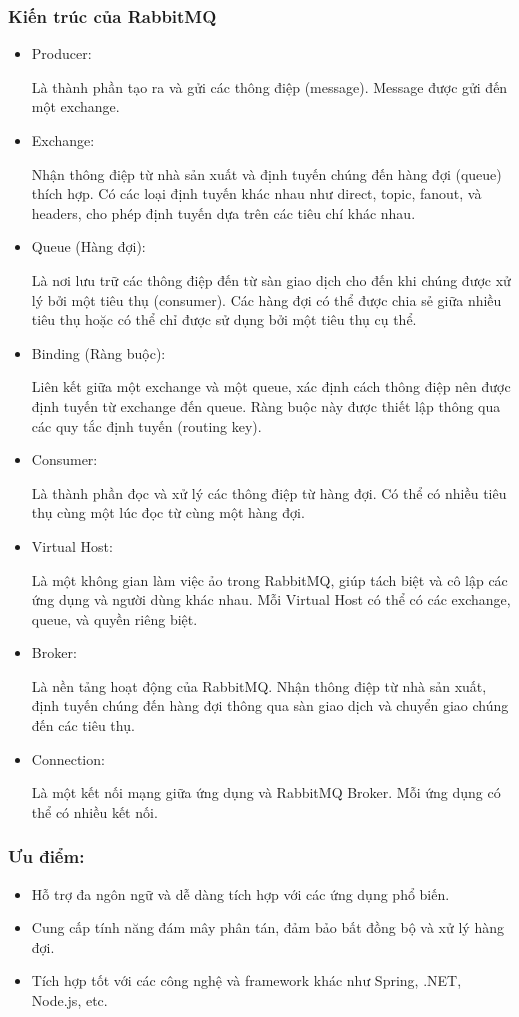 \subsubsection{Kiến trúc của RabbitMQ}
\begin{itemize}
    \item Producer:

Là thành phần tạo ra và gửi các thông điệp (message).
Message được gửi đến một exchange.
    \item Exchange:

Nhận thông điệp từ nhà sản xuất và định tuyến chúng đến hàng đợi (queue) thích hợp.
Có các loại định tuyến khác nhau như direct, topic, fanout, và headers, cho phép định tuyến dựa trên các tiêu chí khác nhau.
    \item Queue (Hàng đợi):

Là nơi lưu trữ các thông điệp đến từ sàn giao dịch cho đến khi chúng được xử lý bởi một tiêu thụ (consumer).
Các hàng đợi có thể được chia sẻ giữa nhiều tiêu thụ hoặc có thể chỉ được sử dụng bởi một tiêu thụ cụ thể.
    \item Binding (Ràng buộc):

Liên kết giữa một exchange và một queue, xác định cách thông điệp nên được định tuyến từ exchange đến queue.
Ràng buộc này được thiết lập thông qua các quy tắc định tuyến (routing key).
    \item Consumer:

Là thành phần đọc và xử lý các thông điệp từ hàng đợi.
Có thể có nhiều tiêu thụ cùng một lúc đọc từ cùng một hàng đợi.
    \item Virtual Host:

Là một không gian làm việc ảo trong RabbitMQ, giúp tách biệt và cô lập các ứng dụng và người dùng khác nhau.
Mỗi Virtual Host có thể có các exchange, queue, và quyền riêng biệt.
    \item Broker:

Là nền tảng hoạt động của RabbitMQ.
Nhận thông điệp từ nhà sản xuất, định tuyến chúng đến hàng đợi thông qua sàn giao dịch và chuyển giao chúng đến các tiêu thụ.
    \item Connection:

Là một kết nối mạng giữa ứng dụng và RabbitMQ Broker.
Mỗi ứng dụng có thể có nhiều kết nối.
\end{itemize}

\subsubsection{Ưu điểm:}
\begin{itemize}
    \item Hỗ trợ đa ngôn ngữ và dễ dàng tích hợp với các ứng dụng phổ biến.
    \item Cung cấp tính năng đám mây phân tán, đảm bảo bất đồng bộ và xử lý hàng đợi.
    \item Tích hợp tốt với các công nghệ và framework khác như Spring, .NET, Node.js, etc.
\end{itemize}

